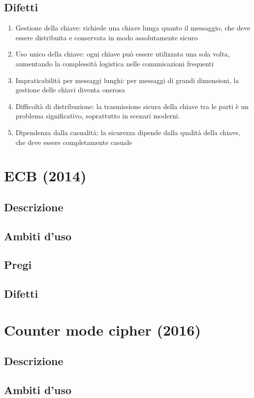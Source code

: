 \documentclass[10pt,oneside,a4paper]{article}
\begin{document}
\subsection{Difetti}
\begin{enumerate}
\item Gestione della chiave: richiede una chiave lunga quanto il messaggio, che deve essere distribuita e conservata in modo assolutamente sicuro
\item Uso unico della chiave: ogni chiave può essere utilizzata una sola volta, aumentando la complessità logistica nelle comunicazioni frequenti
\item Impraticabilità per messaggi lunghi: per messaggi di grandi dimensioni, la gestione delle chiavi diventa onerosa
\item Difficoltà di distribuzione: la trasmissione sicura della chiave tra le parti è un problema significativo, soprattutto in scenari moderni.
\item Dipendenza dalla casualità: la sicurezza dipende dalla qualità della chiave, che deve essere completamente casuale
\end{enumerate}
\section{ECB (2014)}
\subsection{Descrizione}
\subsection{Ambiti d'uso}
\subsection{Pregi}
\subsection{Difetti}
\section{Counter mode cipher (2016)}
\subsection{Descrizione}
\subsection{Ambiti d'uso}
\end{document}
